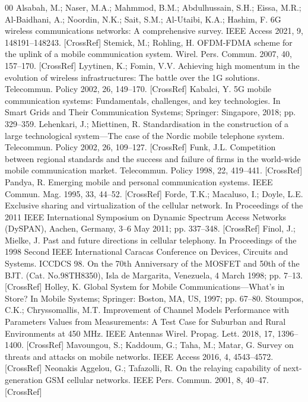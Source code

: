 \documentclass[conference]{IEEEtran}
\begin{document}
\begin{thebibliography}{00}
 Alsabah, M.; Naser, M.A.; Mahmmod, B.M.; Abdulhussain, S.H.; Eissa, M.R.; Al-Baidhani, A.; Noordin, N.K.; Sait, S.M.; Al-Utaibi, K.A.; Hashim, F. 6G wireless communications networks: A comprehensive survey. IEEE Access 2021, 9, 148191–148243. [CrossRef]
 Stemick, M.; Rohling, H. OFDM-FDMA scheme for the uplink of a mobile communication system. Wirel. Pers. Commun. 2007, 40, 157–170. [CrossRef]
 Lyytinen, K.; Fomin, V.V. Achieving high momentum in the evolution of wireless infrastructures: The battle over the 1G solutions. Telecommun. Policy 2002, 26, 149–170. [CrossRef]
 Kabalci, Y. 5G mobile communication systems: Fundamentals, challenges, and key technologies. In Smart Grids and Their Communication Systems; Springer: Singapore, 2018; pp. 329–359.
 Lehenkari, J.; Miettinen, R. Standardisation in the construction of a large technological system—The case of the Nordic mobile telephone system. Telecommun. Policy 2002, 26, 109–127. [CrossRef]
 Funk, J.L. Competition between regional standards and the success and failure of firms in the world-wide mobile communication market. Telecommun. Policy 1998, 22, 419–441. [CrossRef]
 Pandya, R. Emerging mobile and personal communication systems. IEEE Commun. Mag. 1995, 33, 44–52. [CrossRef]
 Forde, T.K.; Macaluso, I.; Doyle, L.E. Exclusive sharing and virtualization of the cellular network. In Proceedings of the 2011 IEEE International Symposium on Dynamic Spectrum Access Networks (DySPAN), Aachen, Germany, 3–6 May 2011; pp. 337–348. [CrossRef]
 Finol, J.; Mielke, J. Past and future directions in cellular telephony. In Proceedings of the 1998 Second IEEE International Caracas Conference on Devices, Circuits and Systems. ICCDCS 98. On the 70th Anniversary of the MOSFET and 50th of the BJT. (Cat. No.98TH8350), Isla de Margarita, Venezuela, 4 March 1998; pp. 7–13. [CrossRef]
 Holley, K. Global System for Mobile Communications—What’s in Store? In Mobile Systems; Springer: Boston, MA, US, 1997; pp. 67–80.
 Stoumpos, C.K.; Chryssomallis, M.T. Improvement of Channel Models Performance with Parameters Values from Measurements: A Test Case for Suburban and Rural Environments at 450 MHz. IEEE Antennas Wirel. Propag. Lett. 2018, 17, 1396–1400. [CrossRef]
 Mavoungou, S.; Kaddoum, G.; Taha, M.; Matar, G. Survey on threats and attacks on mobile networks. IEEE Access 2016, 4, 4543–4572. [CrossRef]
 Neonakis Aggelou, G.; Tafazolli, R. On the relaying capability of next-generation GSM cellular networks. IEEE Pers. Commun. 2001, 8, 40–47. [CrossRef]

\end{thebibliography}
\end{document}
